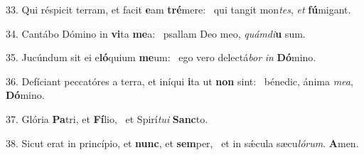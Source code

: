 33. Qui réspicit terram, et facit \textbf{e}am \textbf{tré}mere: \ast\  qui tangit mon\textit{tes}, \textit{et} \textbf{fú}migant.\

34. Cantábo Dómino in \textbf{vi}ta \textbf{me}a: \ast\  psallam Deo meo, \textit{quám}\textit{di}\textbf{u} sum.\

35. Jucúndum sit ei e\textbf{ló}quium \textbf{me}um: \ast\  ego vero delectá\textit{bor} \textit{in} \textbf{Dó}mino.\

36. Defíciant peccatóres a terra, et iníqui \textbf{i}ta ut \textbf{non} sint: \ast\  bénedic, ánima \textit{me}\textit{a}, \textbf{Dó}mino.\

37. Glória \textbf{Pa}tri, et \textbf{Fí}lio, \ast\  et Spirí\textit{tu}\textit{i} \textbf{Sanc}to.\

38. Sicut erat in princípio, et \textbf{nunc}, et \textbf{sem}per, \ast\  et in sǽcula sæcu\textit{ló}\textit{rum}. \textbf{A}men.\


